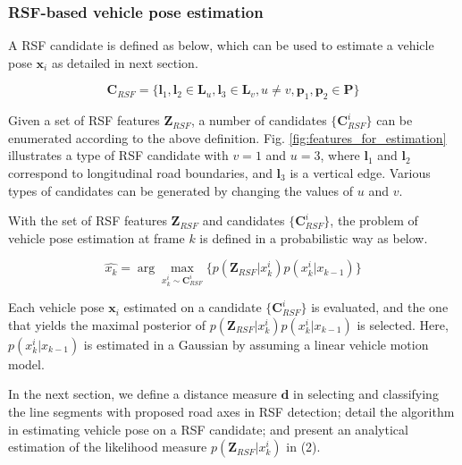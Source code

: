 \documentclass[letterpaper, 10 pt, conference]{ieeeconf}  %
\begin{document}
\subsubsection{RSF-based vehicle pose estimation}
A RSF candidate is defined as below, which can be used to estimate a vehicle pose $\mathbf{x}_i$ as detailed in next section.

\begin{equation}
\mathbf{C}_{RSF}=\{\mathbf{l}_1,\mathbf{l}_2\in \mathbf{L}_u, \mathbf{l}_3\in \mathbf{L}_v, u \neq v, \mathbf{p}_1,\mathbf{p}_2\in \mathbf{P}\}
\label{eq:C_RSF}
\end{equation}

Given a set of RSF features $\mathbf{Z}_{RSF}$, a number of candidates $\{\mathbf{C}_{RSF}^i\}$ can be enumerated according to the above definition. Fig. \ref{fig:features_for_estimation} illustrates a type of RSF candidate with $v=1$ and $u=3$, where $\mathbf{l}_1$ and $\mathbf{l}_2$ correspond to longitudinal road boundaries, and $\mathbf{l}_3$ is a vertical edge. Various types of candidates can be generated by changing the values of $u$ and $v$.

With the set of RSF features $\mathbf{Z}_{RSF}$ and candidates $\{\mathbf{C}_{RSF}^i\}$, the problem of vehicle pose estimation at frame $k$ is defined in a probabilistic way as below.

\begin{equation}
\hat{x_k} = \displaystyle \arg\max _{x_k^i \sim \mathbf{C}_{RSF}^i} \{ p(\mathbf{Z}_{RSF} | x_k^i) p(x_k^i|x_{k-1}) \}
\end{equation}

Each vehicle pose $\mathbf{x}_i$ estimated on a candidate $\{\mathbf{C}_{RSF}^i\}$ is evaluated, and the one that yields the maximal posterior of $p(\mathbf{Z}_{RSF} | x_k^i) p(x_k^i|x_{k-1})$ is selected. Here, $p(x_k^i|x_{k-1})$ is estimated in a Gaussian by assuming a linear vehicle motion model.

In the next section, we define a distance measure $\mathbf{d}$ in selecting and classifying the line segments with proposed road axes in RSF detection; detail the algorithm in estimating vehicle pose on a RSF candidate; and present an analytical estimation of the likelihood measure $p(\mathbf{Z}_{RSF} | x_k^i)$ in (2).
\end{document}
